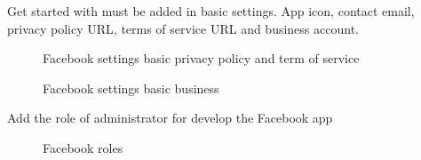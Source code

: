 \documentclass[12pt,oneside,openright,a4paper]{cpe-english-project}
\begin{document}
		\begin{flushleft}
			Get started with must be added in basic settings. App icon, contact email, privacy policy URL, terms of service URL and business account.
		\end{flushleft}
		\begin{figure}[!h]\centering
			\caption{Facebook settings basic privacy policy and term of service}\label{fig:facebook settings basic privacy policy and term of service}
			\caption{Facebook settings basic business}\label{fig:Facebook settings basic business}
		\end{figure}
\pagebreak
		\begin{flushleft}
			Add the role of administrator for develop the Facebook app
		\end{flushleft}
		\begin{figure}[!h]\centering
			\caption{Facebook roles}\label{fig:Facebook roles}
		\end{figure}
\end{document}

